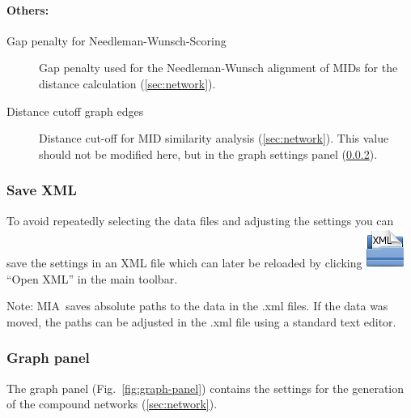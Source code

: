 \documentclass[a4paper,12pt]{scrartcl}
\newcommand*\app{\textsc{MIA}}
\begin{document}
\paragraph{Others:}
\begin{description}
 \item[Gap penalty for Needleman-Wunsch-Scoring]
 Gap penalty used for the Needleman-Wunsch alignment of MIDs for the distance calculation (\ref{sec:network}).

 \item[Distance cutoff graph edges]
 Distance cut-off for MID similarity analysis (\ref{sec:network}). This value should not be modified here, but in the graph settings panel (\ref{sec:graph-panel}).
\end{description}

\subsubsection{Save XML}

To avoid repeatedly selecting the data files and adjusting the settings you can save the settings in an XML file which can later be reloaded by clicking \includegraphics{../gui/icons/document-open-xml.png} ``Open XML'' in the main toolbar.

Note: \app\ saves absolute paths to the data in the .xml files. If the data was moved, the paths can be adjusted in the .xml file using a standard text editor.

\subsubsection{Graph panel}

\label{sec:graph-panel}

The graph panel (Fig.~\ref{fig:graph-panel}) contains the settings for the generation of the compound networks (\ref{sec:network}).
\end{document}
